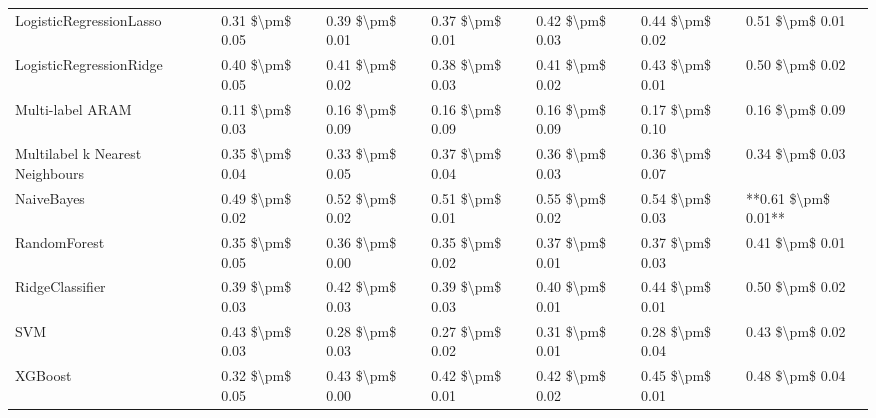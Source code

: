 \begin{tabular}{lllllll}
        LogisticRegressionLasso & 0.31 \$\textbackslash pm\$ 0.05 &           0.39 \$\textbackslash pm\$ 0.01 &       0.37 \$\textbackslash pm\$ 0.01 &        0.42 \$\textbackslash pm\$ 0.03 &                         0.44 \$\textbackslash pm\$ 0.02 &     0.51 \$\textbackslash pm\$ 0.01 \\
        LogisticRegressionRidge & 0.40 \$\textbackslash pm\$ 0.05 &           0.41 \$\textbackslash pm\$ 0.02 &       0.38 \$\textbackslash pm\$ 0.03 &        0.41 \$\textbackslash pm\$ 0.02 &                         0.43 \$\textbackslash pm\$ 0.01 &     0.50 \$\textbackslash pm\$ 0.02 \\
               Multi-label ARAM & 0.11 \$\textbackslash pm\$ 0.03 &           0.16 \$\textbackslash pm\$ 0.09 &       0.16 \$\textbackslash pm\$ 0.09 &        0.16 \$\textbackslash pm\$ 0.09 &                         0.17 \$\textbackslash pm\$ 0.10 &     0.16 \$\textbackslash pm\$ 0.09 \\
Multilabel k Nearest Neighbours & 0.35 \$\textbackslash pm\$ 0.04 &           0.33 \$\textbackslash pm\$ 0.05 &       0.37 \$\textbackslash pm\$ 0.04 &        0.36 \$\textbackslash pm\$ 0.03 &                         0.36 \$\textbackslash pm\$ 0.07 &     0.34 \$\textbackslash pm\$ 0.03 \\
                     NaiveBayes & 0.49 \$\textbackslash pm\$ 0.02 &           0.52 \$\textbackslash pm\$ 0.02 &       0.51 \$\textbackslash pm\$ 0.01 &        0.55 \$\textbackslash pm\$ 0.02 &                         0.54 \$\textbackslash pm\$ 0.03 & **0.61 \$\textbackslash pm\$ 0.01** \\
                   RandomForest & 0.35 \$\textbackslash pm\$ 0.05 &           0.36 \$\textbackslash pm\$ 0.00 &       0.35 \$\textbackslash pm\$ 0.02 &        0.37 \$\textbackslash pm\$ 0.01 &                         0.37 \$\textbackslash pm\$ 0.03 &     0.41 \$\textbackslash pm\$ 0.01 \\
                RidgeClassifier & 0.39 \$\textbackslash pm\$ 0.03 &           0.42 \$\textbackslash pm\$ 0.03 &       0.39 \$\textbackslash pm\$ 0.03 &        0.40 \$\textbackslash pm\$ 0.01 &                         0.44 \$\textbackslash pm\$ 0.01 &     0.50 \$\textbackslash pm\$ 0.02 \\
                            SVM & 0.43 \$\textbackslash pm\$ 0.03 &           0.28 \$\textbackslash pm\$ 0.03 &       0.27 \$\textbackslash pm\$ 0.02 &        0.31 \$\textbackslash pm\$ 0.01 &                         0.28 \$\textbackslash pm\$ 0.04 &     0.43 \$\textbackslash pm\$ 0.02 \\
                        XGBoost & 0.32 \$\textbackslash pm\$ 0.05 &           0.43 \$\textbackslash pm\$ 0.00 &       0.42 \$\textbackslash pm\$ 0.01 &        0.42 \$\textbackslash pm\$ 0.02 &                         0.45 \$\textbackslash pm\$ 0.01 &     0.48 \$\textbackslash pm\$ 0.04 \\
\bottomrule
\end{tabular}
